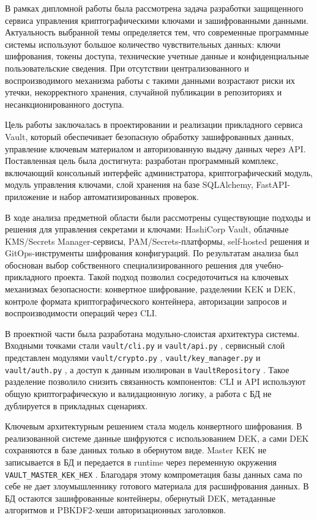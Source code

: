 \documentclass[14pt, a4paper]{extarticle}
\renewcommand{\texttt}[1]{%
  {\def\UrlFont{\ttfamily}\nolinkurl{#1}}%
}
\begin{document}
\clearpage
	
	\newpage
	
	
	В рамках дипломной работы была рассмотрена задача разработки защищенного сервиса управления криптографическими ключами и зашифрованными данными. Актуальность выбранной темы определяется тем, что современные программные системы используют большое количество чувствительных данных: ключи шифрования, токены доступа, технические учетные данные и конфиденциальные пользовательские сведения. При отсутствии централизованного и воспроизводимого механизма работы с такими данными возрастают риски их утечки, некорректного хранения, случайной публикации в репозиториях и несанкционированного доступа.
	
	Цель работы заключалась в проектировании и реализации прикладного сервиса Vault, который обеспечивает безопасную обработку зашифрованных данных, управление ключевым материалом и авторизованную выдачу данных через API. Поставленная цель была достигнута: разработан программный комплекс, включающий консольный интерфейс администратора, криптографический модуль, модуль управления ключами, слой хранения на базе SQLAlchemy, FastAPI-приложение и набор автоматизированных проверок.
	
	В ходе анализа предметной области были рассмотрены существующие подходы и решения для управления секретами и ключами: HashiCorp Vault, облачные KMS/Secrets Manager-сервисы, PAM/Secrets-платформы, self-hosted решения и GitOps-инструменты шифрования конфигураций. По результатам анализа был обоснован выбор собственного специализированного решения для учебно-прикладного проекта. Такой подход позволил сосредоточиться на ключевых механизмах безопасности: конвертное шифрование, разделении KEK и DEK, контроле формата криптографического контейнера, авторизации запросов и воспроизводимости операций через CLI.
	
	В проектной части была разработана модульно-слоистая архитектура системы. Входными точками стали \texttt{vault/cli.py} и \texttt{vault/api.py}, сервисный слой представлен модулями \texttt{vault/crypto.py}, \texttt{vault/key\_manager.py} и \texttt{vault/auth.py}, а доступ к данным изолирован в \texttt{VaultRepository}. Такое разделение позволило снизить связанность компонентов: CLI и API используют общую криптографическую и валидационную логику, а работа с БД не дублируется в прикладных сценариях.
	
	Ключевым архитектурным решением стала модель конвертного шифрования. В реализованной системе данные шифруются с использованием DEK, а сами DEK сохраняются в базе данных только в обернутом виде. Master KEK не записывается в БД и передается в runtime через переменную окружения \texttt{VAULT\_MASTER\_KEK\_HEX}. Благодаря этому компрометация базы данных сама по себе не дает злоумышленнику готового материала для расшифрования данных. В БД остаются зашифрованные контейнеры, обернутый DEK, метаданные алгоритмов и PBKDF2-хеши авторизационных заголовков.
	
\end{document}
